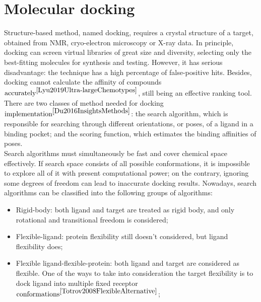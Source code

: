 \section{Molecular docking}
  Structure-based method, named docking, requires a crystal structure of a target, 
obtained from NMR, cryo-electron microscopy or X-ray data.
  In principle, docking can screen virtual libraries of great size and diversity, 
selecting only the best-fitting molecules for synthesis and testing. 
  However, it has serious disadvantage: the technique has a high percentage of false-positive 
hits. 
  Besides, docking cannot calculate the affinity of compounds $\text{accurately}^{\cite{Lyu2019Ultra-largeChemotypes}}$, 
still being an effective ranking tool.\\
  
  There are two classes of method needed for docking $\text{implementation}^{\cite{Du2016InsightsMethods}}$: 
the search algorithm, which is responsible for searching through different orientations, 
or poses, of a ligand in a binding pocket; and the scoring function, which estimates 
the binding affinities of poses.\\
  
  Search algorithms must simultaneously be fast and cover chemical space effectively.
  If search space consists of all possible conformations, it is impossible to explore 
all of it with present computational power; on the contrary, ignoring some degrees 
of freedom can lead to inaccurate docking results.
  Nowadays, search algorithms can be classified into the following groups of algorithms:
  \begin{itemize}
      \item 
      Rigid-body: both ligand and target are treated as rigid body, and only rotational 
and transitional freedom is considered;
      \item Flexible-ligand: protein flexibility still doesn't considered, but ligand flexibility does;
      \item Flexible ligand-flexible-protein: both ligand and target are considered as flexible. One of the ways to take into consideration the target flexibility is to dock ligand into multiple fixed receptor $\text{conformations}^{\cite{Totrov2008FlexibleAlternative}}$;
  \end{itemize}
  

